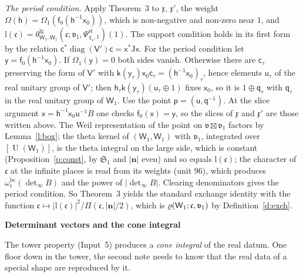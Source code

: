 \documentclass[11pt,a4paper]{article}
\makeatletter
\newcommand{\sect}[2]{\refstepcounter{section}\label{#2}\par\addvspace{19pt plus 4pt minus 2pt}\Needspace{7\baselineskip}%
  \noindent\llap{{\fontsize{13.2}{16}\selectfont\bfseries\color{inkfaint}\thesection}\hspace{9pt}}%
  {\fontsize{13.2}{16}\selectfont\bfseries\color{ink}#1}\par\nopagebreak\vspace{-1pt}}
\theoremstyle{plainx}
\theoremstyle{uprightx}
\renewenvironment{proof}[1][Proof]{\par\pushQED{\qed}\normalfont\topsep0pt\partopsep0pt
  \trivlist\item[\hskip\labelsep\itshape #1.]\ignorespaces}{\popQED\endtrivlist\@endpefalse}
\newcommand{\dS}{\Psi}                 %
\newcommand{\bn}{\mathbf{n}}
\newcommand{\sW}{\mathsf{W}}
\newcommand{\sV}{\mathsf{V}}
\newcommand{\sh}{\mathsf{h}}
\newcommand{\sk}{\mathsf{k}}
\newcommand{\sx}{\mathsf{x}}
\newcommand{\sy}{\mathsf{y}}
\newcommand{\fc}{\mathfrak{c}}
\newcommand{\fv}{\mathfrak{v}}
\newcommand{\fx}{\mathfrak{x}}
\newcommand{\fS}{\mathfrak{S}}
\newcommand{\U}{\operatorname{U}}
\newcommand{\stc}[2]{\dS^{\mathrm{st}}_{#1,#2}}
\newcommand{\thL}[5]{\theta^{\mathrm{lg}}_{#1,#2}(#3;#4,#5)}
\newcommand{\LP}[2]{\Pi(#1,#2)}
\makeatother
\begin{document}
\begin{proof}[Proof of Theorem 1]
\emph{The period condition.} Apply Theorem~3 to $\fx$, $\fx'$, the weight
$\Omega(\sh)=\Omega_1(\mathsf{f}_0(\sh^{-1}\sx_0))$, which is non-negative and non-zero near $1$, and
$\mathrm{l}(\fc)=\thL{\sW_1}{\sW_1}{\fc}{\fv_1}{\stc{\chi_{\fc}}{1}}(1)$. The support condition holds in its first
form by the relation $\mathsf{c}^{*}\operatorname{diag}(\sV')\mathsf{c}=\sx^{*}\mathrm{J}\sx$. For the period
condition let $\sy=\mathsf{f}_0(\sh^{-1}\sx_0)$. If $\Omega_1(\sy)=0$ both sides vanish. Otherwise there are
$\mathsf{c}_\tau$ preserving the form of $\sV'$ with $\sk(\sy_\tau)\sx_0\mathsf{c}_\tau=(\sh^{-1}\sx_0)_\tau$, hence
elements $\mathsf{u}_\tau$ of the real unitary group of $\sV'$; then $\sh_\tau\sk(\sy_\tau)(\mathsf{u}_\tau\oplus1)$
fixes $\sx_0$, so it is $1\oplus\mathsf{q}_\tau$ with $\mathsf{q}_\tau$ in the real unitary group of $\sW_1$. Use
the point $\mathsf{p}=(\mathsf{u},\mathsf{q}^{-1})$. At the slice argument $\sx=\sh^{-1}\sx_0\mathsf{u}^{-1}B$ one
checks $\mathsf{f}_0(\sx)=\sy$, so the slices of $\fx$ and $\fx'$ are those written above. The Weil representation
of the point on $\fv\boxtimes\fv_1$ factors by Lemma~\ref{l:box}; the theta kernel of $(\sW_1,\sW_1)$ with
$\fv_1$, integrated over $[\U(\sW_1)]$, is the theta integral on the large side, which is constant
(Proposition~\ref{p:const}, by $\fS_1$ and $|\bn|$ even) and so equals $\mathrm{l}(\fc)$; the character of $\fc$
at the infinite places is read from its weights (unit 96), which produces $\omega^{\mathrm{bc}}_{\fc}(\det_\infty B)$ and the
power of $|\det_\infty B|$. Clearing denominators gives the period condition. So Theorem~3 yields the standard
exchange identity with the function $\fc\mapsto|\mathrm{l}(\fc)|^2/\LP{\fc}{|\bn|/2}$, which is
$\equalRankThetaRatio{\sW_1}{\fc}{\fv_1}$ by Definition~\ref{d:exch}.
\end{proof}

\sect{Determinant vectors and the cone integral}{s:det}
The tower property (Input~5) produces a \emph{cone integral} of the real datum. One floor down in the tower, the
second note needs to know that the real data of a special shape are reproduced by it.
\end{document}

